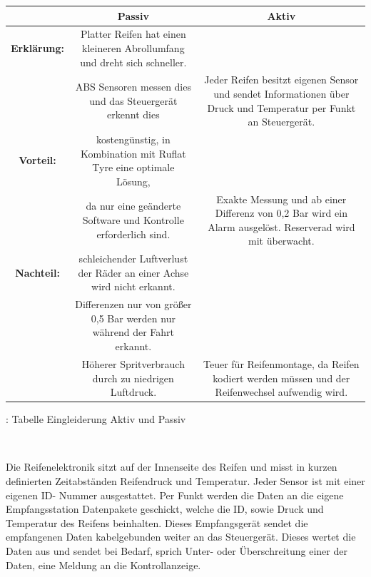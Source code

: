 \documentclass{article}
\begin{document}
				\begin{tabular}{c|c|c}
					
					\textbf {  } & \textbf{Passiv} & \textbf {Aktiv}\\
					
					
					\hline
					\textbf{Erklärung:} & Platter Reifen hat einen kleineren Abrollumfang und dreht sich schneller.\\&ABS Sensoren messen dies und das Steuergerät erkennt dies & Jeder Reifen besitzt eigenen Sensor und sendet Informationen über Druck und Temperatur per Funkt an Steuergerät.\\
					
					
					\hline
					\textbf{Vorteil:} & kostengünstig, in Kombination mit Ruflat Tyre eine optimale Lösung, \\&da nur eine geänderte Software und Kontrolle erforderlich sind. & Exakte Messung und ab einer Differenz von 0,2 Bar wird ein Alarm ausgelöst. Reserverad wird mit überwacht.\\
					

					\hline
					\textbf{Nachteil:} & schleichender Luftverlust der Räder an einer Achse wird nicht erkannt.\\&Differenzen nur von größer 0,5 Bar werden nur während der Fahrt erkannt.\\&  Höherer Spritverbrauch durch zu niedrigen Luftdruck. & Teuer für Reifenmontage, da Reifen kodiert werden müssen und der Reifenwechsel aufwendig wird.\\
					\hline
				
				\end{tabular}
				\caption{ \cite{TS22}: Tabelle Eingleiderung Aktiv und Passiv}\\	
			
			
				\begin{flushleft}
						
					Die Reifenelektronik sitzt auf der Innenseite des Reifen und misst in kurzen definierten Zeitabständen Reifendruck und Temperatur. Jeder Sensor ist mit einer eigenen ID- Nummer ausgestattet. Per Funkt werden die Daten an die eigene Empfangsstation Datenpakete geschickt, welche die ID, sowie Druck und Temperatur des Reifens beinhalten. Dieses Empfangsgerät sendet die empfangenen Daten kabelgebunden weiter an das Steuergerät. Dieses wertet die Daten aus und sendet bei Bedarf, sprich Unter- oder Überschreitung einer der Daten, eine Meldung an die Kontrollanzeige.
					
				\end{flushleft}	
				
\end{document}
